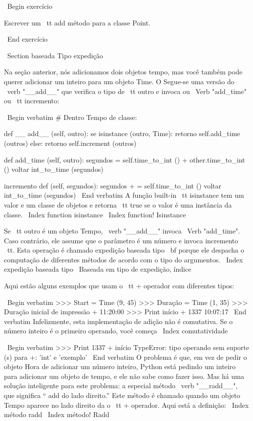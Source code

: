 \documentclass[10pt]{book}
\begin{document}
\begin {itemize}
{{{{{{{{{{{{{{\ Begin {} exercício

Escrever um {\ tt add} método para a classe Point.  

\ End {} exercício


\ Section {baseada Tipo expedição}

Na seção anterior, nós adicionamos dois objetos tempo, mas você
também pode querer adicionar um inteiro para um objeto Time. O
Segue-se uma versão do \ verb "__add__"
que verifica o tipo de {\ tt outro} e invoca ou
\ Verb "add_time" ou {\ tt incremento}:

\ Begin {verbatim}
# Dentro Tempo de classe:

    def __ add__ (self, outro):
        se isinstance (outro, Time):
            retorno self.add_time (outros)
        else:
            retorno self.increment (outros)

    def add_time (self, outro):
        segundos = self.time_to_int () + other.time_to_int ()
        voltar int_to_time (segundos)

    incremento def (self, segundos):
        segundos + = self.time_to_int ()
        voltar int_to_time (segundos)
\ End {verbatim}
%
A função built-in {\ tt isinstance} tem um valor e um
classe de objetos e retorna {\ tt true} se o valor é uma instância
da classe.
\ Index {function isinstance}
\ Index {function! Isinstance}

Se {\ tt outro} é um objeto Tempo, \ verb "__add__" invoca
\ Verb "add_time". Caso contrário, ele assume que o parâmetro
é um número e invoca {incremento \ tt}. Esta operação é
chamado {expedição baseada tipo \ bf} porque ele despacha o
computação de diferentes métodos de acordo com o tipo do
argumentos.
\ Index {expedição baseada tipo}
\ {Baseada em tipo de expedição, índice}

Aqui estão alguns exemplos que usam o {\ tt +} operador com diferentes
tipos:

\ Begin {verbatim}
>>> Start = Time (9, 45)
>>> Duração = Time (1, 35)
>>> Duração inicial de impressão +
11:20:00
>>> Print início + 1337
10:07:17
\ End {verbatim}
%
Infelizmente, esta implementação de adição não é comutativa.
Se o número inteiro é o primeiro operando, você começa
\ Index {} comutatividade

\ Begin {verbatim}
>>> Print 1337 + início
TypeError: tipo operando sem suporte (s) para +: 'int' e 'exemplo'
\ End {verbatim}
%
O problema é que, em vez de pedir o objeto Hora de adicionar um número inteiro,
Python está pedindo um inteiro para adicionar um objeto de tempo, e ele não sabe
como fazer isso. Mas há uma solução inteligente para este problema: a
especial método \ verb "__radd__", que significa `` add do lado direito.''
Este método é chamado quando um objeto Tempo aparece no lado direito da
o {\ tt +} operador. Aqui está a definição:
\ Index {método radd}
\ Index {método! Radd}

}}}}}}}}}}}}}}
\end{itemize}
\end{document}
